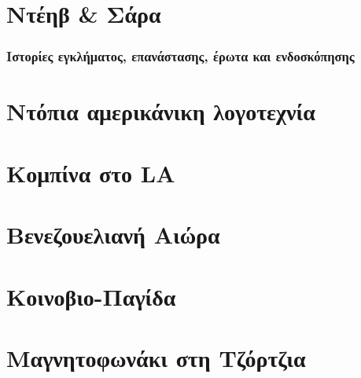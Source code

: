 \documentclass[12pt]{book}
\begin{document}
\setlength{\hsize}{0.85\hsize}
\vspace{85mm}
\justifying

\frontmatter
{}

\chapter*{\Huge \center Ντέηβ \& Σάρα }
\subsection*{\Huge \center Ιστορίες εγκλήματος, επανάστασης, έρωτα και ενδοσκόπησης}
\newpage

\thispagestyle{empty}

\chapter*{\center \normalsize Ντόπια αμερικάνικη λογοτεχνία}

\setcounter{tocdepth}{1}
\renewcommand*\contentsname{Περιεχόμενα}
\tableofcontents{}

\mainmatter
\renewcommand{\labelenumii}{\arabic{enumi}.\arabic{}{enumii}}
\setcounter{page}{6}


\chapter{Κομπίνα στο LA}


\chapter{Βενεζουελιανή Αιώρα}


\chapter{Κοινοβιο-Παγίδα}


\chapter{Μαγνητοφωνάκι στη Τζόρτζια}

\end{document}
